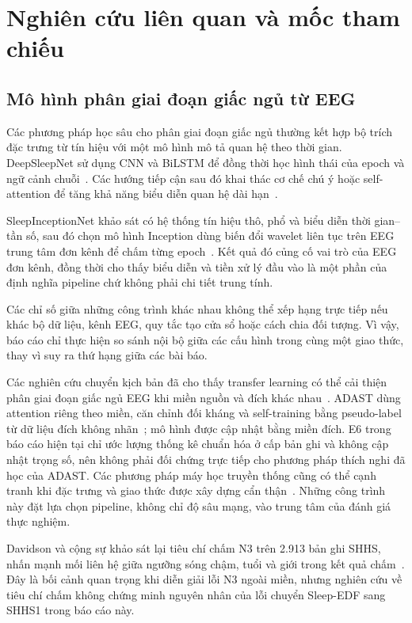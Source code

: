 \section{Nghiên cứu liên quan và mốc tham chiếu}
\label{sec:related_work}

\subsection{Mô hình phân giai đoạn giấc ngủ từ EEG}

Các phương pháp học sâu cho phân giai đoạn giấc ngủ thường kết hợp bộ trích đặc trưng từ tín hiệu với một mô hình mô tả quan hệ theo thời gian. DeepSleepNet sử dụng CNN và BiLSTM để đồng thời học hình thái của epoch và ngữ cảnh chuỗi~\cite{supratak2017deepsleepnet}. Các hướng tiếp cận sau đó khai thác cơ chế chú ý hoặc self-attention để tăng khả năng biểu diễn quan hệ dài hạn~\cite{eldele2021attnsleep,phan2022sleeptransformer}.

SleepInceptionNet khảo sát có hệ thống tín hiệu thô, phổ và biểu diễn thời gian--tần số, sau đó chọn mô hình Inception dùng biến đổi wavelet liên tục trên EEG trung tâm đơn kênh để chấm từng epoch~\cite{haghayegh2023sleepinceptionnet}. Kết quả đó củng cố vai trò của EEG đơn kênh, đồng thời cho thấy biểu diễn và tiền xử lý đầu vào là một phần của định nghĩa pipeline chứ không phải chi tiết trung tính.

Các chỉ số giữa những công trình khác nhau không thể xếp hạng trực tiếp nếu khác bộ dữ liệu, kênh EEG, quy tắc tạo cửa sổ hoặc cách chia đối tượng. Vì vậy, báo cáo chỉ thực hiện so sánh nội bộ giữa các cấu hình trong cùng một giao thức, thay vì suy ra thứ hạng giữa các bài báo.

Các nghiên cứu chuyển kịch bản đã cho thấy transfer learning có thể cải thiện phân giai đoạn giấc ngủ EEG khi miền nguồn và đích khác nhau~\cite{he2023crossscenario}. ADAST dùng attention riêng theo miền, căn chỉnh đối kháng và self-training bằng pseudo-label từ dữ liệu đích không nhãn~\cite{eldele2023adast}; mô hình được cập nhật bằng miền đích. E6 trong báo cáo hiện tại chỉ ước lượng thống kê chuẩn hóa ở cấp bản ghi và không cập nhật trọng số, nên không phải đối chứng trực tiếp cho phương pháp thích nghi đã học của ADAST. Các phương pháp máy học truyền thống cũng có thể cạnh tranh khi đặc trưng và giao thức được xây dựng cẩn thận~\cite{vdd2023traditional}. Những công trình này đặt lựa chọn pipeline, không chỉ độ sâu mạng, vào trung tâm của đánh giá thực nghiệm.

Davidson và cộng sự khảo sát lại tiêu chí chấm N3 trên 2.913 bản ghi SHHS, nhấn mạnh mối liên hệ giữa ngưỡng sóng chậm, tuổi và giới trong kết quả chấm~\cite{davidson2025n3}. Đây là bối cảnh quan trọng khi diễn giải lỗi N3 ngoài miền, nhưng nghiên cứu về tiêu chí chấm không chứng minh nguyên nhân của lỗi chuyển Sleep-EDF sang SHHS1 trong báo cáo này.

